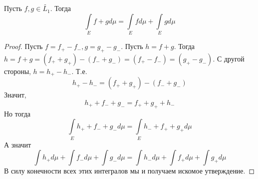 \begin{proposition}
    Пусть $f, g \in \widetilde{L_1}$. Тогда \[\int\limits_E f + gd\mu = \int\limits_E fd\mu + \int\limits_E gd\mu\]
\end{proposition}
\begin{proof}
    Пусть $f = f_+ - f_-, g = g_+ - g_-$. Пусть $h = f + g$. Тогда $h = f + g = (f_+ + g_+) - (f_- + g_-) = (f_+ - f_-) = (g_+ - g_-)$. С другой стороны, $h = h_+ - h_-$. Т.е. \[h_+ - h_- = (f_+ + g_+) - (f_- + g_-)\]
    Значит, \[h_+ + f_- + g_- = f_+ + g_+ + h_-\]
    Но тогда \[\int\limits_E h_+ + f_- + g_-d\mu = \int\limits_E h_- + f_+ + g_+d\mu\]
    А значит \[\int h_+d\mu + \int f_-d\mu + \int g_-d\mu = \int h_-d\mu + \int f_+d\mu + \int g_+d\mu\]
    В силу конечности всех этих интегралов мы и получаем искомое утверждение.
\end{proof}

